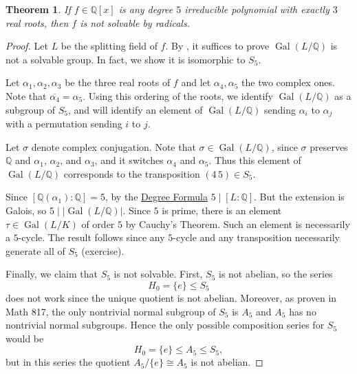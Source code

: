 \documentclass[12pt]{report}
\newtheorem{theorem}{Theorem}[chapter]
\numberwithin{equation}{section}
\numberwithin{theorem}{chapter}
\theoremstyle{definition}
\newtheorem*{basic properties}{Basic Properties}
\newtheorem*{Important Remark}{Important Remark}
\DeclareMathOperator{\Gal}{Gal}
\newcommand{\Q}{\mathbb{Q}}
\begin{document}
\begin{theorem}\label{deg 5 not solvable}
If $f \in \Q[x]$ is any degree $5$ irreducible polynomial with exactly $3$ real roots, then $f$ is not solvable by radicals.
\end{theorem}

\begin{proof} 
Let $L$ be the splitting field of $f$. By , it suffices to prove $\Gal(L/\Q)$ is not a solvable group. In fact, we show it is isomorphic to $S_5$.

Let $\alpha_1, \alpha_2, \alpha_3$ be the three real roots of $f$ and let $\alpha_4, \alpha_5$ the two complex ones.
Note that $\overline{\alpha_4} = \alpha_5$.  Using this ordering of the roots, we identify $\Gal(L/\Q)$ as a subgroup of $S_5$, and will identify an element of $\Gal(L/\Q)$ sending $\alpha_i$ to $\alpha_j$ with a permutation sending $i$ to $j$.

Let $\sigma$ denote complex conjugation. Note that $\sigma \in \Gal(L/\Q)$, since $\sigma$ preserves $\Q$ and $\alpha_1$, $\alpha_2$, and $\alpha_3$, and it switches $\alpha_4$ and $\alpha_5$. Thus this element of $\Gal(L/\Q)$ corresponds to the transposition $(4 \, 5) \in S_5$.


Since $[\Q(\alpha_1): \Q] = 5$, by the \hyperref[deg formula]{Degree Formula} $5 \mid [L : \Q]$. But the extension is Galois, so $5 \mid |\Gal(L/\Q)|$. Since $5$ is prime, there is an element $\tau \in \Gal(L/K)$ of order $5$ by Cauchy's Theorem. Such an element is necessarily a $5$-cycle. The result follows since any $5$-cycle and any transposition necessarily generate all of $S_5$ (exercise).

Finally, we claim that $S_5$ is not solvable. First, $S_5$ is not abelian, so the series 
$$H_0=\{e\}\leq S_5$$
does not work since the unique quotient is not abelian. 
Moreover, as proven in Math 817, the only nontrivial normal subgroup of $S_5$ is $A_5$ and $A_5$ has no nontrivial normal subgroups. Hence the only possible composition series for $S_5$ would be 
$$H_0=\{e\}\leq A_5\leq S_5,$$ 
but in this series the quotient $A_5/\{e\}\cong A_5$ is not abelian.
\end{proof}
\end{document}
